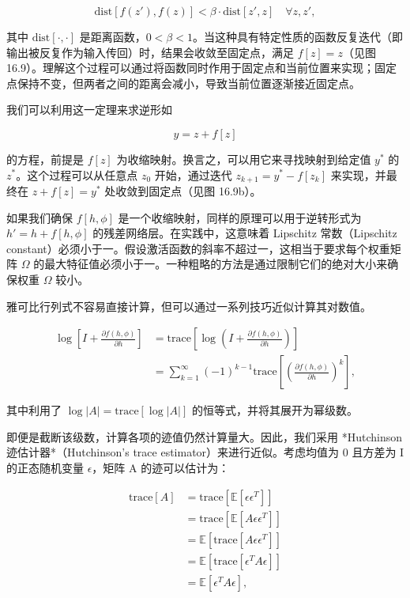 \begin{equation}
\text{dist} [f(z'), f(z)] < \beta \cdot \text{dist} [z', z] \quad \forall z, z', 
\end{equation}

其中 \(\text{dist}[\cdot,\cdot]\) 是距离函数，\(0 < \beta < 1\)。当这种具有特定性质的函数反复迭代（即输出被反复作为输入传回）时，结果会收敛至固定点，满足 \(f[z] = z\)（见图 16.9）。理解这个过程可以通过将函数同时作用于固定点和当前位置来实现；固定点保持不变，但两者之间的距离会减小，导致当前位置逐渐接近固定点。

我们可以利用这一定理来求逆形如

\begin{equation}
y = z + f[z] 
\end{equation}

的方程，前提是 \(f[z]\) 为收缩映射。换言之，可以用它来寻找映射到给定值 \(y^*\) 的 \(z^*\)。这个过程可以从任意点 \(z_0\) 开始，通过迭代 \(z_{k+1} = y^* - f[z_k]\) 来实现，并最终在 \(z + f[z] = y^*\) 处收敛到固定点（见图 16.9b）。

如果我们确保 \(f[h, \phi]\) 是一个收缩映射，同样的原理可以用于逆转形式为 \(h' = h + f[h, \phi]\) 的残差网络层。在实践中，这意味着 Lipschitz 常数（Lipschitz constant）必须小于一。假设激活函数的斜率不超过一，这相当于要求每个权重矩阵 \(\Omega\) 的最大特征值必须小于一。一种粗略的方法是通过限制它们的绝对大小来确保权重 \(\Omega\) 较小。

雅可比行列式不容易直接计算，但可以通过一系列技巧近似计算其对数值。

\begin{align}
\log \left[ I + \frac{\partial f(h, \phi)}{\partial h} \right] &= \text{trace} \left[ \log \left( I + \frac{\partial f(h, \phi)}{\partial h} \right) \right] \\
&= \sum_{k=1}^{\infty} (-1)^{k-1} \text{trace} \left[ \left( \frac{\partial f(h, \phi)}{\partial h} \right)^k \right], 
\end{align} 



其中利用了 \(\log|A| = \text{trace}[\log|A|]\) 的恒等式，并将其展开为幂级数。

即便是截断该级数，计算各项的迹值仍然计算量大。因此，我们采用 *Hutchinson 迹估计器*（Hutchinson's trace estimator）来进行近似。考虑均值为 0 且方差为 I 的正态随机变量 \(\epsilon\)，矩阵 A 的迹可以估计为：

\begin{equation}
\begin{aligned}
\text{trace}[A] &= \text{trace} [\mathbb{E} [\epsilon \epsilon^T]] \\
&= \text{trace} [\mathbb{E} [A \epsilon \epsilon^T]] \\
&= \mathbb{E} [\text{trace} [A \epsilon \epsilon^T]] \\
&= \mathbb{E} [\text{trace} [\epsilon^T A \epsilon]] \\
&= \mathbb{E} [\epsilon^T A \epsilon], \\
\end{aligned} 
\end{equation}

